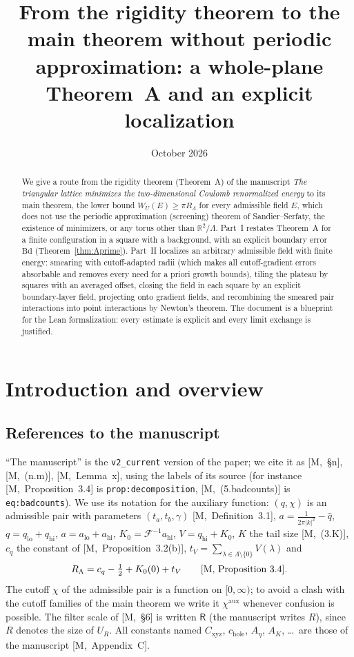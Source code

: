 \documentclass[11pt,reqno]{amsart}
\title[A whole-plane route to the lower bound]{From the rigidity theorem to the main theorem without periodic approximation: a whole-plane Theorem~A and an explicit localization}
\date{October 2026}
\numberwithin{equation}{section}
\theoremstyle{plain}
\theoremstyle{definition}
\newcommand{\R}{\mathbb{R}}
\newcommand{\Lam}{\Lambda}
\newcommand{\lo}{\mathrm{lo}}
\newcommand{\hi}{\mathrm{hi}}
\newcommand{\fR}{\mathsf{R}}
\newcommand{\Bd}{\mathrm{Bd}}
\newcommand{\ms}[1]{\textup{[M,~#1]}}
\begin{document}
\begin{abstract}
We give a route from the rigidity theorem (Theorem~A) of the manuscript \emph{The triangular lattice minimizes the two-dimensional Coulomb renormalized energy} to its main theorem, the lower bound $W_U(E)\ge\pi R_\Lam$ for every admissible field $E$, which does not use the periodic approximation (screening) theorem of Sandier--Serfaty, the existence of minimizers, or any torus other than $\R^2/\Lam$.  Part~I restates Theorem~A for a finite configuration in a square with a background, with an explicit boundary error $\Bd$ (Theorem~\ref{thm:Aprime}).  Part~II localizes an arbitrary admissible field with finite energy: smearing with cutoff-adapted radii (which makes all cutoff-gradient errors absorbable and removes every need for a priori growth bounds), tiling the plateau by squares with an averaged offset, closing the field in each square by an explicit boundary-layer field, projecting onto gradient fields, and recombining the smeared pair interactions into point interactions by Newton's theorem.  The document is a blueprint for the Lean formalization: every estimate is explicit and every limit exchange is justified.
\end{abstract}
\maketitle
\tableofcontents

\section{Introduction and overview}\label{sec:intro}

\subsection{References to the manuscript}
``The manuscript'' is the \texttt{v2\_current} version of the paper; we cite it as \ms{\S n}, \ms{(n.m)}, \ms{Lemma~x}, using the labels of its source (for instance \ms{Proposition~3.4} is \texttt{prop:decomposition}, \ms{(5.badcounts)} is \texttt{eq:badcounts}).  We use its notation for the auxiliary function: $(q,\chi)$ is an admissible pair with parameters $(t_a,t_b,\gamma)$ \ms{Definition~3.1}, $a=\frac1{2\pi|k|^2}-\widehat q$, $q=q_\lo+q_\hi$, $a=a_\lo+a_\hi$, $K_0=\mathcal F^{-1}a_\hi$, $V=q_\hi+K_0$, $K$ the tail size \ms{(3.K)}, $c_q$ the constant of \ms{Proposition~3.2(b)}, $t_V=\sum_{\lambda\in\Lam\setminus\{0\}}V(\lambda)$ and
\begin{equation}\label{eq:RLam}
R_\Lam=c_q-\tfrac12+K_0(0)+t_V\qquad\text{\ms{Proposition~3.4}}.
\end{equation}
The cutoff $\chi$ of the admissible pair is a function on $[0,\infty)$; to avoid a clash with the cutoff families of the main theorem we write it $\chi^{\mathrm{aux}}$ whenever confusion is possible.  The filter scale of \ms{\S6} is written $\fR$ (the manuscript writes $R$), since $R$ denotes the size of $U_R$.  All constants named $C_{\mathrm{xyz}}$, $c_{\mathrm{hole}}$, $A_\eta$, $A_K$, \dots\ are those of the manuscript \ms{Appendix~C}.
\end{document}

